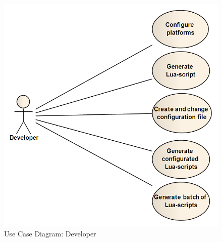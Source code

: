 \begin{figure}[htbp]
	\center
	\includegraphics[width=\textwidth]{./planning/img/developer.png}
	\caption{Use Case Diagram: Developer\label{fig:req:ucdev}}
\end{figure}


